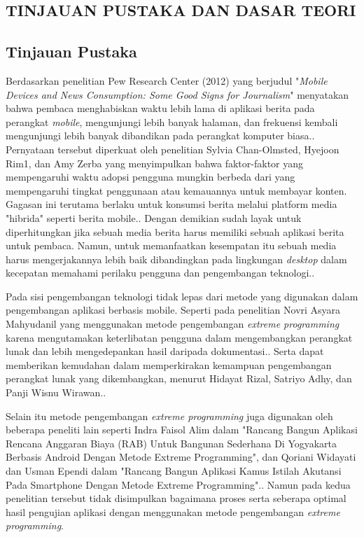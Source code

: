 \begin{spacing}{2}
\chapter{TINJAUAN PUSTAKA DAN DASAR TEORI}                

\section{Tinjauan Pustaka}
  Berdasarkan penelitian Pew Research Center (2012) yang berjudul "\emph{Mobile Devices and News Consumption: Some Good Signs for Journalism}" menyatakan bahwa pembaca menghabiskan waktu lebih lama di aplikasi berita pada perangkat \emph{mobile}, mengunjungi lebih banyak halaman, dan frekuensi kembali mengunjungi lebih banyak dibandikan pada perangkat komputer biasa.\cite{journalism2012}. Pernyataan tersebut diperkuat oleh penelitian Sylvia Chan-Olmsted, Hyejoon Rim1, dan Amy Zerba yang menyimpulkan bahwa faktor-faktor yang mempengaruhi waktu adopsi pengguna mungkin berbeda dari yang mempengaruhi tingkat penggunaan atau kemauannya untuk membayar konten. Gagasan ini terutama berlaku untuk konsumsi berita melalui platform media "hibrida" seperti berita mobile.\cite{sylvia2012}. Dengan demikian sudah layak untuk diperhitungkan jika sebuah media berita harus memiliki sebuah aplikasi berita untuk pembaca. Namun, untuk memanfaatkan kesempatan itu sebuah media harus mengerjakannya lebih baik dibandingkan pada lingkungan \emph{desktop} dalam kecepatan memahami perilaku pengguna dan pengembangan teknologi.\cite{journalism2012}.

  Pada sisi pengembangan teknologi tidak lepas dari metode yang digunakan dalam pengembangan aplikasi berbasis mobile. Seperti pada penelitian Novri Asyara Mahyudanil yang menggunakan metode pengembangan \emph{extreme programming} karena mengutamakan keterlibatan pengguna dalam mengembangkan perangkat lunak dan lebih mengedepankan hasil daripada dokumentasi.\cite{commerce2014}. Serta dapat memberikan kemudahan dalam memperkirakan kemampuan pengembangan perangkat lunak yang dikembangkan, menurut Hidayat Rizal, Satriyo Adhy, dan Panji Wisnu Wirawan.\cite{mlearning}.

  Selain itu metode pengembangan \emph{extreme programming} juga digunakan oleh beberapa peneliti lain seperti Indra Faisol Alim dalam "Rancang Bangun Aplikasi Rencana Anggaran Biaya (RAB) Untuk Bangunan Sederhana Di Yogyakarta Berbasis Android Dengan Metode Extreme Programming", dan Qoriani Widayati dan Usman Ependi dalam "Rancang Bangun Aplikasi Kamus Istilah Akutansi Pada Smartphone Dengan Metode Extreme Programming".\cite{rab2016}\cite{kamus-akuntansi2014}. Namun pada kedua penelitian tersebut tidak disimpulkan bagaimana proses serta seberapa optimal hasil pengujian aplikasi dengan menggunakan metode pengembangan \emph{extreme programming}.


\end{spacing}
